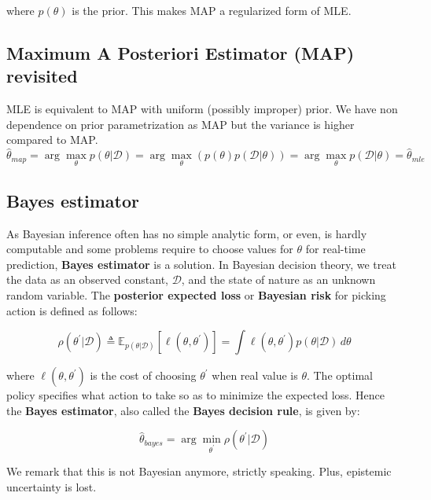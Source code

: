 \documentclass[12pt, a4paper]{article}
\theoremstyle{definition}
\numberwithin{figure}{section}
\numberwithin{equation}{section}
\numberwithin{table}{section}
\begin{document}
where $p(\theta)$ is the prior. This makes MAP a regularized form of MLE.

\subsection{Maximum A Posteriori Estimator (MAP) revisited}
MLE is equivalent to MAP with uniform (possibly improper) prior. We have non dependence on prior parametrization as MAP but the variance is higher compared to MAP.
\begin{equation*}
\hat{\theta}_{map} = \arg\max\limits_{\theta} p(\theta | \mathcal{D}) 
= \arg\max\limits_{\theta} \left( p(\theta) p(\mathcal{D} | \theta) \right) 
= \arg\max\limits_{\theta} p(\mathcal{D} | \theta) 
= \hat{\theta}_{mle}
\end{equation*}


\subsection{Bayes estimator}
As Bayesian inference often has no simple analytic form, or even, is hardly computable and some problems require to choose values for $\theta$ for real-time prediction, \textbf{Bayes estimator} is a solution. In Bayesian decision theory, we treat the data as an observed constant, $\mathcal{D}$, and the state of nature as an unknown random variable. The \textbf{posterior expected loss} or \textbf{Bayesian risk} for picking action is defined as follows:

\begin{equation}
\rho(\theta^{'} | \mathcal{D}) \triangleq \mathbb{E}_{p(\theta | \mathcal{D})} \left[ \ell(\theta, \theta^{'}) \right] = \int \ell(\theta, \theta^{'}) p(\theta | \mathcal{D}) \, d \theta
\end{equation}

where $\ell(\theta,\theta^{'})$ is the cost of choosing $\theta^{'}$ when real value is $\theta$. The optimal policy specifies what action to take so as to minimize the expected loss. Hence the \textbf{Bayes estimator}, also called the \textbf{Bayes decision rule}, is given by:

\begin{equation}
    \hat{\theta}_{bayes}= \arg\min\limits_{\theta^{'}}\rho(\theta^{'} | \mathcal{D})
\end{equation}

We remark that this is not Bayesian anymore, strictly speaking. Plus, epistemic uncertainty is lost.
\end{document}
